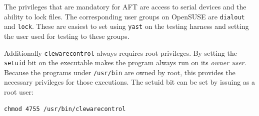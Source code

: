 \documentclass[a4paper,11pt]{article}
\newcommand{\cmd}[1]{\texttt{#1}}
\begin{document}
The privileges that are mandatory for AFT are access to serial devices and the ability to lock files. The corresponding user groups on OpenSUSE are \cmd{dialout} and \cmd{lock}. These are easiest to set using \cmd{yast} on the testing harness and setting the user used for testing to these groups.

Additionally \cmd{clewarecontrol} always requires root privileges. By setting the \cmd{setuid} bit on the executable makes the program always run on its \emph{owner user}. Because the programs under \cmd{/usr/bin} are owned by root, this provides the necessary privileges for those executions. The setuid bit can be set by issuing as a root user:
\begin{lstlisting}
chmod 4755 /usr/bin/clewarecontrol
\end{lstlisting}
\end{document}
